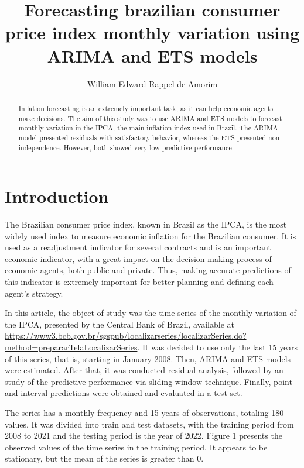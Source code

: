 \documentclass{statsoc}
\title[Forecasting brazilian inflation using ARIMA and ETS
models]{Forecasting brazilian consumer price index monthly variation
using ARIMA and ETS models}
\author[William Edward Rappel de Amorim]{William Edward Rappel de
Amorim}
\begin{document}
\begin{abstract}
Inflation forecasting is an extremely important task, as it can help
economic agents make decisions. The aim of this study was to use ARIMA
and ETS models to forecast monthly variation in the IPCA, the main
inflation index used in Brazil. The ARIMA model presented residuals with
satisfactory behavior, whereas the ETS presented non-independence.
However, both showed very low predictive performance.
\end{abstract}

\hypertarget{introduction}{%
\section{Introduction}\label{introduction}}

The Brazilian consumer price index, known in Brazil as the IPCA, is the
most widely used index to measure economic inflation for the Brazilian
consumer. It is used as a readjustment indicator for several contracts
and is an important economic indicator, with a great impact on the
decision-making process of economic agents, both public and private.
Thus, making accurate predictions of this indicator is extremely
important for better planning and defining each agent's strategy.

In this article, the object of study was the time series of the monthly
variation of the IPCA, presented by the Central Bank of Brazil,
available at
\url{https://www3.bcb.gov.br/sgspub/localizarseries/localizarSeries.do?method=prepararTelaLocalizarSeries}.
It was decided to use only the last 15 years of this series, that is,
starting in January 2008. Then, ARIMA and ETS models were estimated.
After that, it was conducted residual analysis, followed by an study of
the predictive performance via sliding window technique. Finally, point
and interval predictions were obtained and evaluated in a test set.

The series has a monthly frequency and 15 years of observations,
totaling 180 values. It was divided into train and test datasets, with
the training period from 2008 to 2021 and the testing period is the year
of 2022. Figure 1 presents the observed values of the time series in the
training period. It appears to be stationary, but the mean of the series
is greater than 0.
\end{document}
